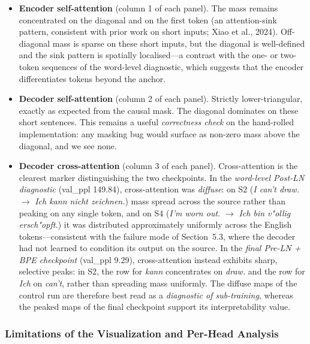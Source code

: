 \documentclass[10pt]{article}
\begin{document}
\begin{itemize}
\item \textbf{Encoder self-attention} (column 1 of each panel). The mass remains concentrated on the diagonal and on the first token (an attention-sink pattern, consistent with prior work on short inputs; Xiao et al., 2024). Off-diagonal mass is sparse on these short inputs, but the diagonal is well-defined and the sink pattern is spatially localised---a contrast with the one- or two-token sequences of the word-level diagnostic, which suggests that the encoder differentiates tokens beyond the anchor.

\item \textbf{Decoder self-attention} (column 2 of each panel). Strictly lower-triangular, exactly as expected from the causal mask. The diagonal dominates on these short sentences. This remains a useful \textit{correctness check} on the hand-rolled implementation: any masking bug would surface as non-zero mass above the diagonal, and we see none.

\item \textbf{Decoder cross-attention} (column 3 of each panel). Cross-attention is the clearest marker distinguishing the two checkpoints. In the \textit{word-level Post-LN diagnostic} (val\_ppl 149.84), cross-attention was \textit{diffuse}: on S2 (\textit{I can't draw.} $\rightarrow$ \textit{Ich kann nicht zeichnen.}) mass spread across the source rather than peaking on any single token, and on S4 (\textit{I'm worn out.} $\rightarrow$ \textit{Ich bin v"ollig ersch"opft.}) it was distributed approximately uniformly across the English tokens---consistent with the failure mode of Section~5.3, where the decoder had not learned to condition its output on the source. In the \textit{final Pre-LN + BPE checkpoint} (val\_ppl 9.29), cross-attention instead exhibits sharp, selective peaks: in S2, the row for \textit{kann} concentrates on \textit{draw.} and the row for \textit{Ich} on \textit{can't}, rather than spreading mass uniformly. The diffuse maps of the control run are therefore best read as a \textit{diagnostic of sub-training}, whereas the peaked maps of the final checkpoint support its interpretability value.
\end{itemize}

\subsubsection{Limitations of the Visualization and Per-Head Analysis}
\end{document}
